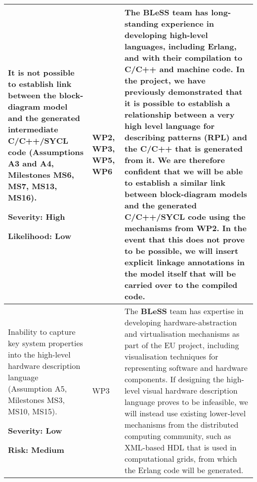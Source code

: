 \documentclass[a4paper,11pt]{article}
\newcommand{\project}[1]{\textbf{#1}\xspace}
\newcommand{\BLESS}{\project{BLeSS}}
\newcommand{\TheProject}{\BLESS}
\begin{document}
\begin{longtable}{| p{3.5cm} | p{1.5cm} | p{11.8cm}  |}
\\ \hline
It is not possible to establish link between the block-diagram model and the generated intermediate C/C++/SYCL code (Assumptions A3 and A4, Milestones MS6, MS7, MS13, MS16).
\par\vspace{1ex}
\textbf{Severity: High}
\par
\textbf{Likelihood: Low} &
WP2, WP3, WP5, WP6  &
The \TheProject{} team has long-standing experience in developing high-level languages, including Erlang, and with their compilation to C/C++ and machine code.
In the \rephrase{} project, we have previously demonstrated that it is possible to establish a relationship between
a very high level language for describing patterns (RPL) and the C/C++ that is generated from it. We are therefore confident that
we will be able to establish a similar link between block-diagram models and the generated C/C++/SYCL code using the
mechanisms from WP2. In the event that this does not prove to be possible, we will insert explicit linkage annotations in the model
itself that will be carried over to the compiled code.

\\ \hline
Inability to capture key system properties into the high-level hardware description language (Assumption A5, Milestones MS3, MS10, MS15).
\par\vspace{1ex}
\textbf{Severity: Low}
\par
\textbf{Risk: Medium}
& WP3 &
The \TheProject{} team has expertise in developing hardware-abstraction and virtualisation
mechanisms as part of the \paraphrase{} EU project, including visualisation techniques for
representing software and hardware components. If designing the high-level visual hardware
description language proves to be infeasible, we will instead use existing lower-level mechanisms from the distributed computing
community, such as XML-based HDL that is used in computational
grids, from which the Erlang code will be generated.




\end{longtable}
\end{document}
